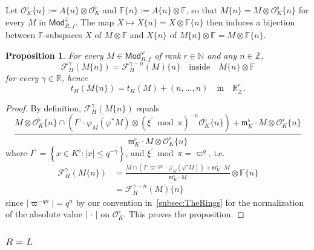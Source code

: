 \documentclass[11pt]{article}
\newtheorem{prop}[theo]{Proposition}
\theoremstyle{definition}
\numberwithin{equation}{section}
\numberwithin{figure}{section}
\numberwithin{table}{section}
\newcommand{\Mod}{\mathsf{Mod}}
\begin{document}
Let $\mathcal{O}_{K}^{\flat}\{n\}:=A\{n\}\otimes\mathcal{O}_{K}^{\flat}$ and $\mathbb{F}\{n\}:=A\{n\}\otimes\mathbb{F}$, so that $M\{n\}=M\otimes\mathcal{O}_{K}^{\flat}\{n\}$ for every $M$ in $\Mod_{R,f}^{\varphi}$. The map $X\mapsto X\{n\}=X\otimes\mathbb{F}\{n\}$ then induces a bijection between $\mathbb{F}$-subspaces $X$ of $M\otimes\mathbb{F}$ and $X\{n\}$ of $M\{n\}\otimes\mathbb{F}=M\otimes\mathbb{F}\{n\}$.

\begin{prop}\label{prop:tH(twist)4O_K^flat}
For every $M\in\Mod_{R,f}^{\varphi}$ of rank $r\in\mathbb{N}$ and any $n\in\mathbb{Z}$,
\[
\mathcal{F}_{H}^{\gamma}(M\{n\})=\mathcal{F}_{H}^{\gamma-n}(M)\{n\}\quad\text{inside}\quad M\{n\}\otimes\mathbb{F}
\]
for every $\gamma\in\mathbb{R}$, hence
\[
t_{H}(M\{n\})=t_{H}(M)+(n,\dots,n)\quad\text{in}\quad\mathbb{R}_{\geq}^{r}.
\]
\end{prop}
\begin{proof}
By definition, $\mathcal{F}_{H}^{\gamma}(M\{n\})$ equals
\[
\frac{M\otimes\mathcal{O}_{K}^{\flat}\{n\}\cap\left(I^{\gamma}\cdot\varphi_{M}\left(\varphi^{\ast}M\right)\otimes(\xi^{\prime}\bmod\pi)^{-n}\mathcal{O}_{K}^{\flat}\{n\}\right)+\mathfrak{m}_{K}^{\flat}\cdot M\otimes\mathcal{O}_{K}^{\flat}\{n\}}{\mathfrak{m}_{K}^{\flat}\cdot M\otimes\mathcal{O}_{K}^{\flat}\{n\}}
\]
where $I^{\gamma}=\left\{ x\in K^{\flat}:\left|x\right|\leq q^{-\gamma}\right\} $, and $\xi^{\prime}\bmod\pi=\varpi^{q}$, i.e.
\begin{align*}
\mathcal{F}_{H}^{\gamma}(M\{n\}) & = \frac{M\cap\left(I^{\gamma}\varpi^{-qn}\cdot\varphi_{M}\left(\varphi^{\ast}M\right)\right)+\mathfrak{m}_{K}^{\flat}\cdot M}{\mathfrak{m}_{K}^{\flat}\cdot M}\otimes\mathbb{F}\{n\}\\
& = \mathcal{F}_{H}^{\gamma-n}(M)\{n\}
\end{align*}
since $\left|\varpi^{-qn}\right|=q^{n}$ by our convention in~\ref{subsec:TheRings} for the normalization of the absolute value $|{\,\cdot\,}|$ on $\mathcal{O}_{K}^{\flat}$. This proves the proposition.
\end{proof}

\subsubsection{\texorpdfstring{$R=L$}{R=L}}\label{subsec:RisL}
\end{document}
